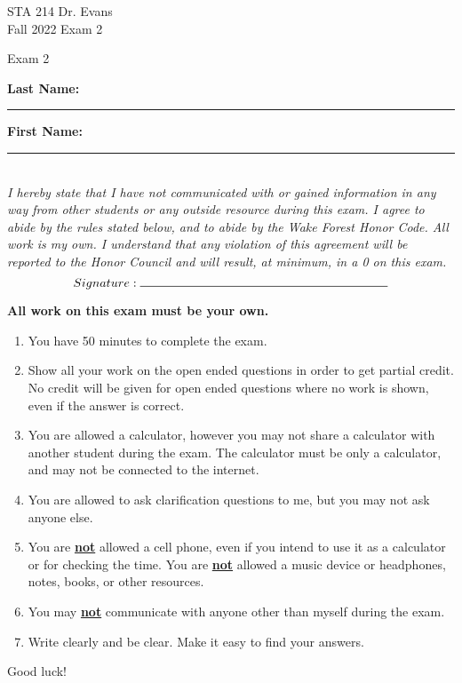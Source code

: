 \documentclass[11pt]{article}
\newcommand{\hl}[1]{\textbf{\underline{#1}}}
\begin{document}
\begin{titlepage}

\enlargethispage{\baselineskip}


STA 214 \hfill Dr. Evans \\
Fall 2022	\hfill Exam 2\\

\vspace{-2cm}

\begin{center}
{\Huge Exam 2}	
\end{center}

$\:$ \\

\textbf{Last Name:} \rule{5cm}{0.5pt}	\hfill	 \textbf{First Name:}  \rule{5cm}{0.5pt}	 \\
$\:$ \\
$\:$ \\

\textit{I hereby state that I have not communicated with or gained information in any way from other students or any outside resource during this exam. I agree to abide by the rules stated below, and to abide by the Wake Forest Honor Code. All work is my own. I understand that any violation of this agreement will be reported to the Honor Council and will result, at minimum, in a 0 on this exam.}
\[ Signature: \rule{7cm}{0.5pt}\]

\hdashrule[0.5ex]{\textwidth}{0.5pt}{3mm}

\textbf{All work on this exam must be your own.}

{\small
\begin{enumerate}
\item You have 50 minutes to complete the exam.
\item Show all your work on the open ended questions in order to get partial credit. No credit will be given for open ended questions where no work is shown, even if the answer is correct.
\item You are allowed a calculator, however you may not share a calculator with another student during the exam. The calculator must be only a calculator, and may not be connected to the internet. 
\item You are allowed to ask clarification questions to me, but you may not ask anyone else. 
\item You are \hl{not} allowed a cell phone, even if you intend to use it as a calculator or for checking the time. You are \hl{not} allowed a music device or headphones, notes, books, or other resources. 
\item You may \hl{not} communicate with anyone other than myself during the exam.
\item Write clearly and be clear. Make it easy to find your answers. 
\end{enumerate}
}
\begin{center}
{\Large Good luck!}
\end{center}
\hdashrule[0.5ex]{\textwidth}{0.5pt}{3mm}


\end{titlepage}
\end{document}
